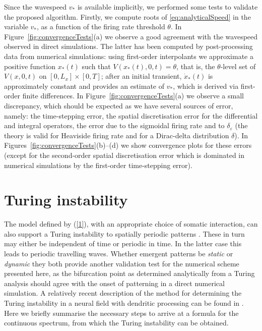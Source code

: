 \documentclass[a4paper,final]{siamart190516}
\newcommand{\ep}{\varepsilon}
\begin{document}
Since the wavespeed $v_*$ is available implicitly, we performed some tests
to validate the proposed algorithm. Firstly, we compute roots of
\eqref{eq:analyticalSpeed} in the variable $v_*$, as a function of the firing rate
threshold $\theta$. In Figure~\ref{fig:convergenceTests}(a) we observe a good agreement with
the wavespeed observed in direct simulations. The latter has been
computed by post-processing data from numerical simulations: using first-order
interpolants we approximate a positive function $x_*(t)$ such that $V(x_*(t),0,t) =
\theta$, that is, the $\theta$-level set of $V(x,0,t)$ on $[0,L_x] \times [0,T]$;
after an initial transient, $\dot x_*(t)$ is approximately constant and provides an
estimate of $v_*$, which is derived via first-order finite differences. In
Figure~\ref{fig:convergenceTests}(a) we observe a small discrepancy, which should be expected as
we have several sources of error, namely: the time-stepping error, the spatial
discretisation error for the differential and integral operators, the error due to
the sigmoidal firing rate and to $\delta_\ep$ (the theory is
valid for Heaviside firing rate and for a Dirac-delta distribution $\delta$). In
Figures~\ref{fig:convergenceTests}(b)--(d) we show convergence plots for these errors (except for
the second-order spatial discretisation error which is dominated in numerical
simulations by the first-order time-stepping error).

\section{Turing instability}\label{sec:TuringTest}
The model defined by (\ref{1}), with an appropriate choice of somatic interaction,
can also support a Turing instability to spatially periodic patterns
\cite{Bressloff96}.  These in turn may either be independent of time or periodic in
time.  In the latter case this leads to periodic travelling waves.  Whether emergent
patterns be \textit{static} or \textit{dynamic} they both provide another validation
test for the numerical scheme presented here, as the bifurcation point as determined
analytically from a Turing analysis should agree with the onset of patterning in a
direct numerical simulation.  A relatively recent description of the method for
determining the Turing instability in a neural field with dendritic processing can be
found in \cite{Coombes2014}.  Here we briefly summarise the necessary steps to arrive
at a formula for the continuous spectrum, from which the Turing instability can be
obtained.
\end{document}
